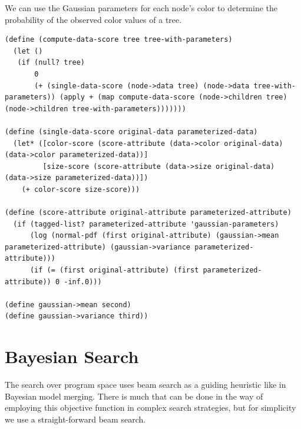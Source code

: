 \documentclass[a4paper,10pt]{article}
\begin{document}
We can use the Gaussian parameters for each node's color to determine the probability of the observed color values of a tree.
\begin{lstlisting}[frame=trBL]
(define (compute-data-score tree tree-with-parameters)
  (let ()
   (if (null? tree)
       0
       (+ (single-data-score (node->data tree) (node->data tree-with-parameters)) (apply + (map compute-data-score (node->children tree) (node->children tree-with-parameters)))))))

(define (single-data-score original-data parameterized-data)
  (let* ([color-score (score-attribute (data->color original-data) (data->color parameterized-data))]
         [size-score (score-attribute (data->size original-data) (data->size parameterized-data))])
    (+ color-score size-score)))

(define (score-attribute original-attribute parameterized-attribute)
  (if (tagged-list? parameterized-attribute 'gaussian-parameters)
      (log (normal-pdf (first original-attribute) (gaussian->mean parameterized-attribute) (gaussian->variance parameterized-attribute)))
      (if (= (first original-attribute) (first parameterized-attribute)) 0 -inf.0)))

(define gaussian->mean second)
(define gaussian->variance third))

\end{lstlisting}

\section{Bayesian Search}
The search over program space uses beam search as a guiding heuristic like in Bayesian model merging.  There is much that can be done in the way of employing this objective function in complex search strategies, but for simplicity we use a straight-forward beam search.  
\end{document}
